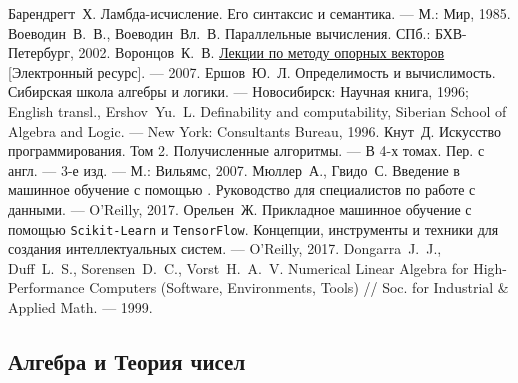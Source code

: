 \begin{thebibliography}{199}
 Барендрегт~Х. Ламбда-исчисление. Его синтаксис и семантика. --- М.: Мир, 1985.
 Воеводин~В.~В., Воеводин~Вл.~В. Параллельные вычисления. СПб.: БХВ-Петербург, 2002.
 Воронцов~К.~В. \href{http://www.ccas.ru/voron/download/SVM.pdf}{Лекции по методу опорных векторов} [Электронный ресурс]. --- 2007.
 Ершов~Ю.~Л. Определимость и вычислимость. Сибирская школа алгебры и логики.
--- Новосибирск: Научная книга, 1996; English transl., Ershov~Yu.~L.
Definability and computability, Siberian School of Algebra and Logic. --- New York: Consultants Bureau, 1996.
 Кнут~Д. Искусство программирования. Том 2. Получисленные алгоритмы. --- В 4-х томах. Пер. с англ. --- 3-е изд. --- М.: Вильямс, 2007.
 Мюллер~А., Гвидо~С. Введение в машинное обучение с помощью \Python. Руководство для специалистов по работе с данными. --- O'Reilly, 2017.
 Орельен~Ж. Прикладное машинное обучение с помощью \texttt{Scikit-Learn} и \texttt{TensorFlow}. Концепции, инструменты и техники для создания интеллектуальных систем. --- O'Reilly, 2017.
 Dongarra~J.~J., Duff~L.~S., Sorensen~D.~C., Vorst~H.~A.~V. Numerical Linear Algebra for High-Performance Computers (Software, Environments, Tools) // Soc. for Industrial \& Applied Math. --- 1999.

\subsection*{Алгебра и Теория чисел}


\end{thebibliography}
